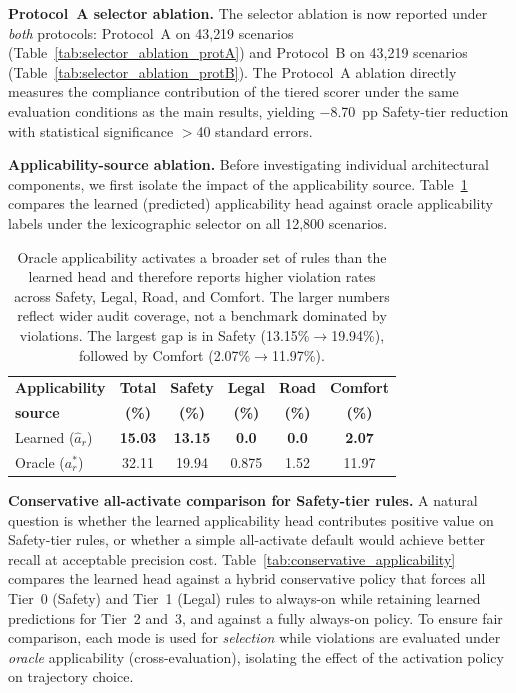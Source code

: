 \noindent\textbf{Protocol~A selector ablation.}  The selector ablation is now reported under \emph{both} protocols: Protocol~A on 43{,}219 scenarios (Table~\ref{tab:selector_ablation_protA}) and Protocol~B on 43{,}219 scenarios (Table~\ref{tab:selector_ablation_protB}).  The Protocol~A ablation directly measures the compliance contribution of the tiered scorer under the same evaluation conditions as the main results, yielding $-$8.70~pp Safety-tier reduction with statistical significance $>$40 standard errors.

\noindent\textbf{Applicability-source ablation.}  Before investigating individual architectural components, we first isolate the impact of the applicability source.  Table~\ref{tab:applicability_ablation} compares the learned (predicted) applicability head against oracle applicability labels under the lexicographic selector on all 12{,}800 scenarios.

\begin{table}[t]
\centering
\caption{Applicability-Source Ablation: Oracle vs.\ Learned (12{,}800 Scenarios, Lexicographic Selection)}
\label{tab:applicability_ablation}
\setlength{\tabcolsep}{3pt}
\begin{tabular}{lccccc}
\toprule
\textbf{Applicability} & \textbf{Total} & \textbf{Safety} & \textbf{Legal} & \textbf{Road} & \textbf{Comfort} \\
\textbf{source} & \textbf{(\%)} & \textbf{(\%)} & \textbf{(\%)} & \textbf{(\%)} & \textbf{(\%)} \\
\midrule
Learned ($\hat{a}_r$)  & \textbf{15.03} & \textbf{13.15} & \textbf{0.0} & \textbf{0.0} & \textbf{2.07} \\
Oracle ($a_r^*$)       & 32.11 & 19.94 & 0.875 & 1.52 & 11.97 \\
\bottomrule
\end{tabular}
\vspace{1mm}
\caption*{\footnotesize Oracle applicability activates a broader set of rules than the learned head and therefore reports higher violation rates across Safety, Legal, Road, and Comfort.  The larger numbers reflect wider audit coverage, not a benchmark dominated by violations.  The largest gap is in Safety (13.15\%$\to$19.94\%), followed by Comfort (2.07\%$\to$11.97\%).}
\end{table}

\noindent\textbf{Conservative all-activate comparison for Safety-tier rules.}  A natural question is whether the learned applicability head contributes positive value on Safety-tier rules, or whether a simple all-activate default would achieve better recall at acceptable precision cost.  Table~\ref{tab:conservative_applicability} compares the learned head against a hybrid conservative policy that forces all Tier~0 (Safety) and Tier~1 (Legal) rules to always-on while retaining learned predictions for Tier~2 and~3, and against a fully always-on policy.  To ensure fair comparison, each mode is used for \emph{selection} while violations are evaluated under \emph{oracle} applicability (cross-evaluation), isolating the effect of the activation policy on trajectory choice.

